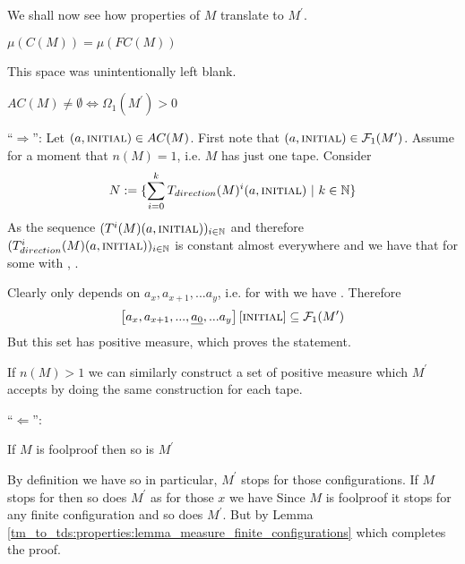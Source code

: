 We shall now see how properties of $M$ translate to $M^\prime$.

\begin{Lemma} \label{tm_to_tds:properties:lemma_measure_finite_configurations}
	$\mu(C(M)) = \mu(FC(M))$
\end{Lemma}
\proof
	This space was unintentionally left blank.
\endproof

\begin{Lemma}
	$AC(M) \neq \emptyset \Leftrightarrow \Omega_1(M^\prime) > 0$
\end{Lemma}
\proof
	``$\Rightarrow$'':
	Let $(a,\text{\scshape{initial}}) \in AC(M)$.
	First note that $(a,\text{\scshape{initial}}) \in \mathcal{F}_1(M^\prime)$.
	Assume for a moment that $n(M) = 1$, i.e. $M$ has just one tape. Consider
	\begin{align*}
		N := \{ \sum_{i=0}^k T_{direction}(M)^i(a,\text{\scshape{initial}})~|~k \in \mathbb{N} \}
	\end{align*}
	As the sequence $(T^i(M)(a,\text{\scshape{initial}}))_{i \in \mathbb{N}}$ and therefore $(T_{direction}^i(M)(a,\text{\scshape{initial}}))_{i \in \mathbb{N}}$ is constant almost everywhere
	and 
	we have that  for some  with , .
	
	Clearly  only depends on $a_x, a_{x+1},...a_y$, i.e. for  with  we have . Therefore
	\begin{align*}
		\left [ a_x, a_{x+1},...,\underline{a_0},...a_y \right ] \left [\text{\scshape{initial}} \right ] \subseteq \mathcal{F}_1(M^\prime)
	\end{align*}
	But this set has positive measure, which proves the statement.

	If $n(M) > 1$ we can similarly construct a set of positive measure which $M^\prime$ accepts by doing the same construction for each tape.

	``$\Leftarrow$'':
\endproof

\begin{Lemma}
	If $M$ is foolproof then so is $M^\prime$
\end{Lemma}
\proof
	By definition we have  so in particular, $M^\prime$ stops for those configurations.
	If $M$ stops for  then so does $M^\prime$ as for those $x$ we have 
	Since $M$ is foolproof it stops for any finite configuration and so does $M^\prime$. But  by Lemma \ref{tm_to_tds:properties:lemma_measure_finite_configurations} which completes the proof.
\endproof

